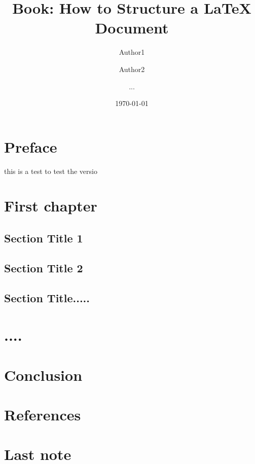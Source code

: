 \documentclass[11pt,a4paper]{book}
\begin{document}
\title{Book: How to Structure a LaTeX Document}
\author{Author1 \and Author2 \and ...}
\date{\today}

\maketitle

\frontmatter

\chapter{Preface}
this is a test to test the versio
\mainmatter
\chapter{First chapter}
\section{Section Title 1}
\section{Section Title 2}
\section{Section Title.....}

\chapter{....}

\chapter{Conclusion}

\chapter*{References}


\backmatter
\chapter{Last note}
\end{document}
